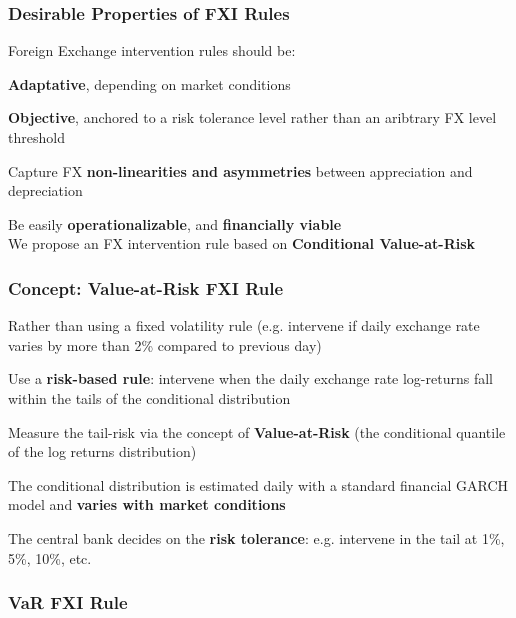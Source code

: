 \documentclass{beamer}
\newenvironment{wideitemize}{\itemize\addtolength{\itemsep}{10pt}}{\enditemize}
\begin{document}
\begin{frame}
  \frametitle{Desirable Properties of FXI Rules}
  Foreign Exchange intervention rules should be:\\
  \medskip  
  \begin{wideitemize}
  \item \textbf{Adaptative}, depending on market conditions
  \item \textbf{Objective}, anchored to a risk tolerance level
    rather than an aribtrary FX level threshold
  \item Capture FX \textbf{non-linearities and asymmetries} between appreciation and
    depreciation
  \item Be easily \textbf{operationalizable}, and \textbf{financially viable}\\
  \end{wideitemize}
\medskip  
We propose an FX intervention rule based on \textbf{Conditional Value-at-Risk}  
\end{frame}


\begin{frame}
  \frametitle{Concept: Value-at-Risk FXI Rule}
  \begin{wideitemize}
    \item Rather than using a fixed volatility rule (e.g. intervene if daily
      exchange rate varies by more than 2\% compared to previous day)
    \item Use a \textbf{risk-based rule}: intervene when the daily exchange
      rate log-returns fall within the
      tails of the conditional distribution
    \item Measure the tail-risk via the concept of \textbf{Value-at-Risk} (the
      conditional quantile of the log returns distribution) 
    \item The conditional distribution is estimated daily with a standard
      financial GARCH model and \textbf{varies with market conditions}
    \item The central bank decides on the \textbf{risk tolerance}:
      e.g. intervene in the tail at 1\%, 5\%, 10\%, etc.
  \end{wideitemize}
\end{frame}

\begin{frame}
  \frametitle{VaR FXI Rule}
\end{frame}
\end{document}
